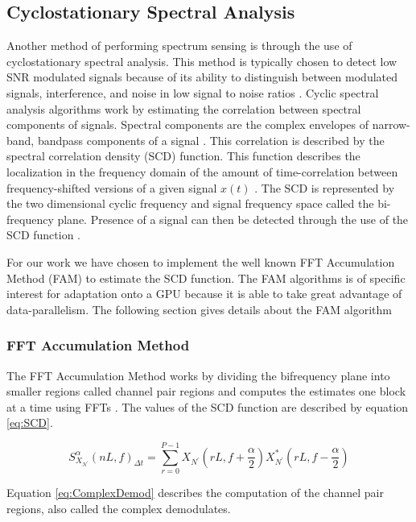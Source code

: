 \subsection{Cyclostationary Spectral Analysis}
\label{sect:cyclo}
Another method of performing spectrum sensing is through the use of cyclostationary spectral analysis.  This method is typically chosen to detect low SNR modulated signals because of its ability to distinguish between modulated signals, interference, and noise in low signal to noise ratios \cite{FenChenWan08}.  Cyclic spectral analysis algorithms work by estimating the correlation between spectral components of signals.  Spectral components are the complex envelopes of narrow-band, bandpass components of a signal \cite{RobBroLoo91}.  This correlation is described by the spectral correlation density (SCD) function.  This function describes the localization in the frequency domain of the amount of time-correlation between frequency-shifted versions of a given signal $x(t)$ \cite{Costa96}.  The SCD is represented by the two dimensional cyclic frequency and signal frequency space \cite{FenChenWan08} called the bi-frequency plane.  Presence of a signal can then be detected through the use of the SCD function \cite{Costa96}.

For our work we have chosen to implement the well known FFT Accumulation Method (FAM) to estimate the SCD function.  The FAM algorithms is of specific interest for adaptation onto a GPU because it is able to take great advantage of data-parallelism.  The following section gives details about the FAM algorithm

\subsubsection{FFT Accumulation Method}
\label{sect:FAM}
The FFT Accumulation Method works by dividing the bifrequency plane into smaller regions called channel pair regions and computes the estimates one block at a time using FFTs \cite{Pace03}.  The values of the SCD function are described by equation \ref{eq:SCD}.

\begin{equation}
S^{\alpha}_{X_{N^\prime}} {(n L, f)}_{\Delta t} = \sum_{r=0}^{P-1} X_{N^\prime}(r L,f + \frac{\alpha}{2}) X_{N^\prime}^*(r L, f - \frac{\alpha}{2})
\label{eq:SCD}
\end{equation}

Equation \ref{eq:ComplexDemod} describes the computation of the channel pair regions, also called the complex demodulates.

